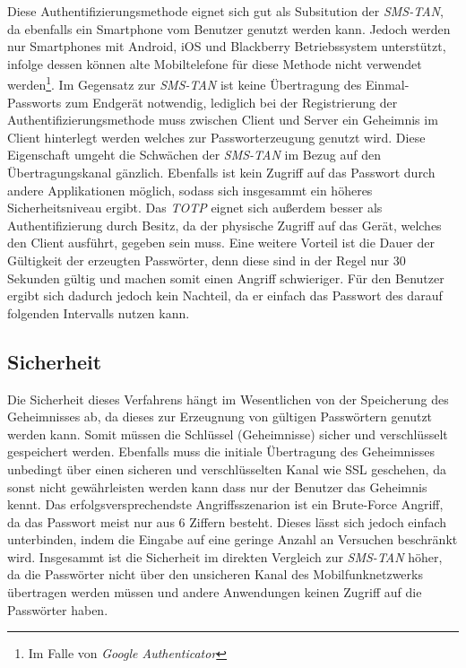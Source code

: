 \documentclass[11pt,a4paper,ngerman]{scrreprt}
\begin{document}
Diese Authentifizierungsmethode eignet sich gut als Subsitution der \textit{SMS-TAN}, da ebenfalls ein Smartphone vom Benutzer genutzt werden kann. Jedoch werden nur Smartphones mit Android, iOS und Blackberry Betriebssystem unterstützt, infolge dessen können alte Mobiltelefone für diese Methode nicht verwendet werden\footnote{Im Falle von \textit{Google Authenticator}}. Im Gegensatz zur \textit{SMS-TAN} ist keine Übertragung des Einmal-Passworts zum Endgerät notwendig, lediglich bei der Registrierung der Authentifizierungsmethode muss zwischen Client und Server ein Geheimnis im Client hinterlegt werden welches zur Passworterzeugung  genutzt wird. Diese Eigenschaft umgeht die Schwächen der \textit{SMS-TAN} im Bezug auf den Übertragungskanal gänzlich. Ebenfalls ist kein Zugriff auf das Passwort durch andere Applikationen möglich, sodass sich insgesammt ein höheres Sicherheitsniveau ergibt. Das \textit{TOTP} eignet sich außerdem besser als Authentifizierung durch Besitz, da der physische Zugriff auf das Gerät, welches den Client ausführt, gegeben sein muss. Eine weitere Vorteil ist die Dauer der Gültigkeit der erzeugten Passwörter, denn diese sind in der Regel nur 30 Sekunden gültig und machen somit einen Angriff schwieriger. Für den Benutzer ergibt sich dadurch jedoch kein Nachteil, da er einfach das Passwort des darauf folgenden Intervalls nutzen kann.

\subsection{Sicherheit}
Die Sicherheit dieses Verfahrens hängt im Wesentlichen von der Speicherung des Geheimnisses ab, da dieses zur Erzeugnung von gültigen Passwörtern genutzt werden kann. Somit müssen die Schlüssel (Geheimnisse) sicher und verschlüsselt gespeichert werden. Ebenfalls muss die initiale Übertragung des Geheimnisses unbedingt über einen sicheren und verschlüsselten Kanal wie SSL geschehen, da sonst nicht gewährleisten werden kann dass nur der Benutzer das Geheimnis kennt. Das erfolgsversprechendste Angriffsszenarion ist ein Brute-Force Angriff, da das Passwort meist nur aus 6 Ziffern besteht. Dieses lässt sich jedoch einfach unterbinden, indem die Eingabe auf eine geringe Anzahl an Versuchen beschränkt wird. Insgesammt ist die Sicherheit im direkten Vergleich zur \textit{SMS-TAN} höher, da die Passwörter nicht über den unsicheren Kanal des Mobilfunknetzwerks übertragen werden müssen und andere Anwendungen keinen Zugriff auf die Passwörter haben.
\end{document}
